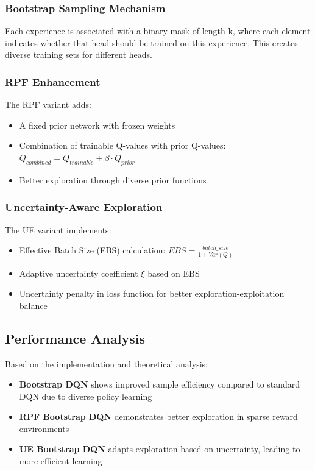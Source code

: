 \documentclass[12pt]{article}
\begin{document}
{{{\subsubsection{Bootstrap Sampling Mechanism}
Each experience is associated with a binary mask of length k, where each element indicates whether that head should be trained on this experience. This creates diverse training sets for different heads.

\subsubsection{RPF Enhancement}
The RPF variant adds:
\begin{itemize}
    \item A fixed prior network with frozen weights
    \item Combination of trainable Q-values with prior Q-values: $Q_{combined} = Q_{trainable} + \beta \cdot Q_{prior}$
    \item Better exploration through diverse prior functions
\end{itemize}

\subsubsection{Uncertainty-Aware Exploration}
The UE variant implements:
\begin{itemize}
    \item Effective Batch Size (EBS) calculation: $EBS = \frac{batch\_size}{1 + Var(Q)}$
    \item Adaptive uncertainty coefficient $\xi$ based on EBS
    \item Uncertainty penalty in loss function for better exploration-exploitation balance
\end{itemize}

\subsection{Performance Analysis}

Based on the implementation and theoretical analysis:

\begin{itemize}
    \item \textbf{Bootstrap DQN} shows improved sample efficiency compared to standard DQN due to diverse policy learning
    \item \textbf{RPF Bootstrap DQN} demonstrates better exploration in sparse reward environments
    \item \textbf{UE Bootstrap DQN} adapts exploration based on uncertainty, leading to more efficient learning
\end{itemize}

}}}
\end{document}
